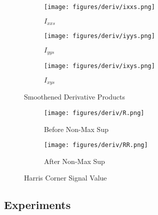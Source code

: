 \documentclass{article}
\begin{document}
\begin{figure}[H]
     \centering
     \begin{subfigure}[b]{0.3\textwidth}
         \centering
         \texttt{[image: figures/deriv/ixxs.png]}
         \caption{$I_{xxs}$}
         \label{fig:I_{xxs}}
     \end{subfigure}
     \hfill
     \begin{subfigure}[b]{0.3\textwidth}
         \centering
         \texttt{[image: figures/deriv/iyys.png]}
         \caption{$I_{yys}$}
         \label{fig:I_{yys}}
     \end{subfigure}
     \hfill
     \begin{subfigure}[b]{0.3\textwidth}
         \centering
         \texttt{[image: figures/deriv/ixys.png]}
         \caption{$I_{xys}$}
         \label{fig:I_{xys}}
     \end{subfigure}
     
        \caption{Smoothened Derivative Products}
        \label{fig:sdrv}
\end{figure}


\begin{figure}[H]
     \centering
     \begin{subfigure}[b]{0.4\textwidth}
         \centering
         \texttt{[image: figures/deriv/R.png]}
         \caption{Before Non-Max Sup}
         \label{fig:befharsig}
     \end{subfigure}
     \begin{subfigure}[b]{0.4\textwidth}
         \centering
         \texttt{[image: figures/deriv/RR.png]}
         \caption{After Non-Max Sup}
         \label{fig:aftharsig}
     \end{subfigure}
     
        \caption{Harris Corner Signal Value}
        \label{fig:harsig}
\end{figure}


\subsection{Experiments}

\end{document}
